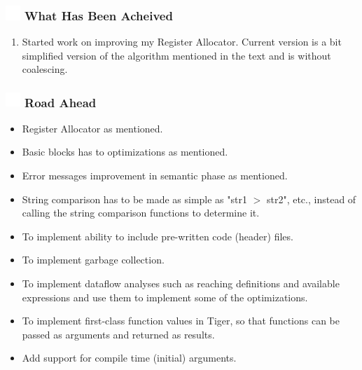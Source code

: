 \documentclass{beamer}
\newcommand{\ft}[1]{
  \frametitle{\includegraphics[height=0.55cm, width=0.55cm, keepaspectratio]{assets/tiger.png} #1}
}
\newcounter{saveenumi}
\newcommand{\seti}{\setcounter{saveenumi}{\value{enumi}}}
\newcommand{\conti}{\setcounter{enumi}{\value{saveenumi}}}
\begin{document}
\begin{frame}[fragile]
  \ft{What Has Been Acheived}
  \begin{enumerate}
    \conti
    \item Started work on improving my Register Allocator. Current version is a bit simplified version of the algorithm mentioned in the text and is without coalescing.
    \seti
  \end{enumerate}
\end{frame}

\begin{frame}[fragile]
  \ft{Road Ahead}
  \begin{itemize}
    \item Register Allocator as mentioned.
    \item Basic blocks has to optimizations as mentioned.
    \item Error messages improvement in semantic phase as mentioned.
    \item String comparison has to be made as simple as "str1 $>$ str2", etc.,  instead of calling the string comparison functions to determine it.
    \item To implement ability to include pre-written code (header) files.
    \item To implement garbage collection.
    \item To implement dataflow analyses such as reaching definitions and available expressions and use them to implement some of the optimizations. 
    \item To implement first-class function values in Tiger, so that functions can be passed as arguments and returned as results.
    \item Add support for compile time (initial) arguments.
  \end{itemize}
\end{frame}
\end{document}
